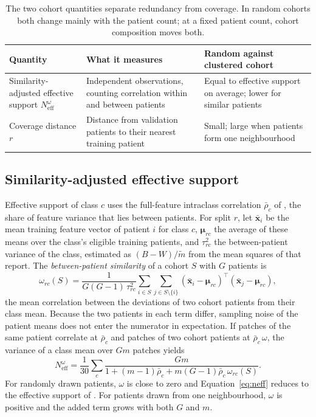 \documentclass[11pt]{article}
\newcommand{\Neff}{N_{\mathrm{eff}}}
\begin{document}
\begin{table}[htbp]
\centering
\renewcommand{\arraystretch}{1.15}
\begin{tabularx}{\textwidth}{@{}lYY@{}}
\toprule
Quantity & What it measures & Random against clustered cohort \\
\midrule
Similarity-adjusted effective support $\Neff^{\omega}$ & Independent observations, counting correlation within and between patients & Equal to effective support on average; lower for similar patients \\
Coverage distance $r$ & Distance from validation patients to their nearest training patient & Small; large when patients form one neighbourhood \\
\bottomrule
\end{tabularx}
\caption{The two cohort quantities separate redundancy from coverage. In random cohorts both change mainly with the patient count; at a fixed patient count, cohort composition moves both.}
\label{tab:quantities}
\end{table}

\subsection{Similarity-adjusted effective support}
\label{sec:similarity}
Effective support of class $c$ uses the full-feature intraclass correlation $\bar\rho_c$ of \citet{queisler2026multidirectionalRedundancy}, the share of feature variance that lies between patients. For split $r$, let $\bar{\mathbf x}_i$ be the mean training feature vector of patient $i$ for class $c$, $\boldsymbol\mu_{rc}$ the average of these means over the class's eligible training patients, and $\tau^2_{rc}$ the between-patient variance of the class, estimated as $(B-W)/\widetilde m$ from the mean squares of that report. The \emph{between-patient similarity} of a cohort $S$ with $G$ patients is
\begin{equation}
 \omega_{rc}(S)=\frac{1}{G(G-1)\,\tau^2_{rc}}\sum_{i\in S}\sum_{j\in S\setminus\{i\}}(\bar{\mathbf x}_i-\boldsymbol\mu_{rc})^{\top}(\bar{\mathbf x}_j-\boldsymbol\mu_{rc}),
 \label{eq:omega}
\end{equation}
\noindent the mean correlation between the deviations of two cohort patients from their class mean. Because the two patients in each term differ, sampling noise of the patient means does not enter the numerator in expectation. If patches of the same patient correlate at $\bar\rho_c$ and patches of two cohort patients at $\bar\rho_c\,\omega$, the variance of a class mean over $Gm$ patches yields
\begin{equation}
 \Neff^{\omega}=\frac{1}{30}\sum_{c}\frac{Gm}{1+(m-1)\bar\rho_c+m(G-1)\bar\rho_c\,\omega_{rc}(S)}.
 \label{eq:neff}
\end{equation}
\noindent For randomly drawn patients, $\omega$ is close to zero and Equation~\eqref{eq:neff} reduces to the effective support of \citet{queisler2026multidirectionalRedundancy}. For patients drawn from one neighbourhood, $\omega$ is positive and the added term grows with both $G$ and $m$.
\end{document}
